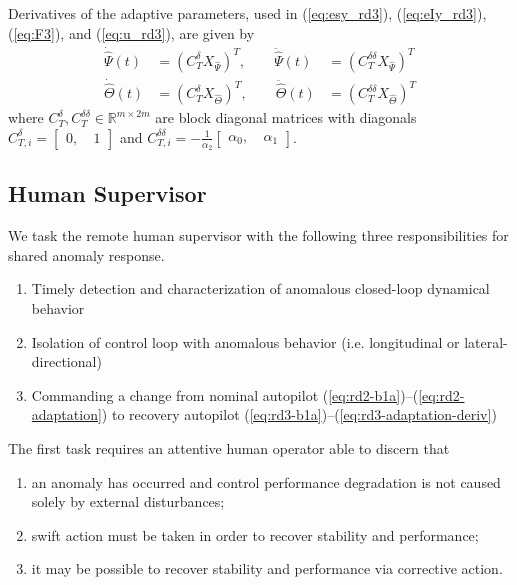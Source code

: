 \documentclass[english]{ifacconf}
\begin{document}
Derivatives of the adaptive parameters, used in (\ref{eq:esy_rd3}), (\ref{eq:eIy_rd3}), (\ref{eq:F3}), and (\ref{eq:u_rd3}), are given by
\begin{equation}
\begin{aligned}
	\dot{\hat{\Psi}}(t) &= (C_T^\delta X_{\hat{\Psi}})^T, \qquad \ddot{\hat{\Psi}}(t) &= (C_T^{\delta\delta}X_{\hat{\Psi}})^T \\
	\dot{\hat{\Theta}}(t) &= (C_T^\delta X_{\hat{\Theta}})^T, \qquad \ddot{\hat{\Theta}}(t) &= (C_T^{\delta\delta}X_{\hat{\Theta}})^T
\end{aligned} \label{eq:rd3-adaptation-deriv}
\end{equation}
where $C_T^{\delta}, C_T^{\delta \delta} \in \mathbb{R}^{m \times 2m}$ are block diagonal matrices with diagonals $C_{T,i}^{\delta} = \begin{bmatrix} 0,~ & 1	\end{bmatrix}$ and $C_{T,i}^{\delta\delta} = -\frac{1}{\alpha_2}\begin{bmatrix} \alpha_0,~ & \alpha_1 \end{bmatrix}$. 

\subsection{Human Supervisor}\label{subsec:sc_human}
We task the remote human supervisor with the following three responsibilities for shared anomaly response.
\begin{enumerate}[label=\arabic*.]
	\item Timely detection and characterization of anomalous closed-loop dynamical behavior
	\item Isolation of control loop with anomalous behavior (i.e. longitudinal or lateral-directional)
	\item Commanding a change from nominal autopilot (\ref{eq:rd2-b1a})--(\ref{eq:rd2-adaptation}) to recovery autopilot (\ref{eq:rd3-b1a})--(\ref{eq:rd3-adaptation-deriv})
\end{enumerate}

The first task requires an attentive human operator able to discern that 
\begin{enumerate}[label=(\alph*)]
	\item an anomaly has occurred and control performance degradation is not caused solely by external disturbances;
	\item swift action must be taken in order to recover stability and performance;
	\item it may be possible to recover stability and performance via corrective action.
\end{enumerate}
\end{document}
